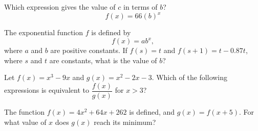 Which expression gives the value of \(c\) in terms of \(b\)?
\[
f(x) = 66(b)^x
\]

\vspace{0.75em}


\vspace{2em}
\newpage

\newpage

\noindent\markforreview
\vspace{1em}
\vspace{1em}

The exponential function \(f\) is defined by
\[
f(x) = ab^x,
\]
where \(a\) and \(b\) are positive constants.
If \(f(s) = t\) and \(f(s + 1) = t - 0.87t\), where \(s\) and \(t\) are constants, what is the value of \(b\)?

\vspace{0.75em}


\vspace{2em}
\newpage

\noindent\markforreview
\vspace{1em}
\vspace{1em}

Let \(f(x) = x^3 - 9x\) and \(g(x) = x^2 - 2x - 3\). Which of the following expressions is equivalent to \(\dfrac{f(x)}{g(x)}\) for \(x > 3\)?

\vspace{0.75em}


\newpage

\newpage

\noindent\markforreview
\vspace{1em}
\vspace{1em}

The function \(f(x) = 4x^2 + 64x + 262\) is defined, and \(g(x) = f(x + 5)\). For what value of \(x\) does \(g(x)\) reach its minimum?

\vspace{0.75em}


